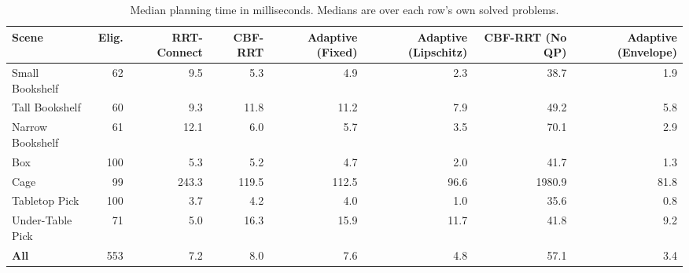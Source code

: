 \begin{table}[t]
  \centering
  \caption{Median planning time in milliseconds. Medians are over each row's own solved problems.}
  \label{tab:mbm-per-scene-time}
  \small
  \begin{tabular}{lrrrrrrr}
    \toprule
    Scene & Elig. & RRT-Connect & CBF-RRT & Adaptive (Fixed) & Adaptive (Lipschitz) & CBF-RRT (No QP) & Adaptive (Envelope) \\
    \midrule
    Small Bookshelf & 62 & 9.5 & 5.3 & 4.9 & 2.3 & 38.7 & 1.9 \\
    Tall Bookshelf & 60 & 9.3 & 11.8 & 11.2 & 7.9 & 49.2 & 5.8 \\
    Narrow Bookshelf & 61 & 12.1 & 6.0 & 5.7 & 3.5 & 70.1 & 2.9 \\
    Box & 100 & 5.3 & 5.2 & 4.7 & 2.0 & 41.7 & 1.3 \\
    Cage & 99 & 243.3 & 119.5 & 112.5 & 96.6 & 1980.9 & 81.8 \\
    Tabletop Pick & 100 & 3.7 & 4.2 & 4.0 & 1.0 & 35.6 & 0.8 \\
    Under-Table Pick & 71 & 5.0 & 16.3 & 15.9 & 11.7 & 41.8 & 9.2 \\
    \midrule
    \textbf{All} & 553 & 7.2 & 8.0 & 7.6 & 4.8 & 57.1 & 3.4 \\
    \bottomrule
  \end{tabular}
\end{table}

